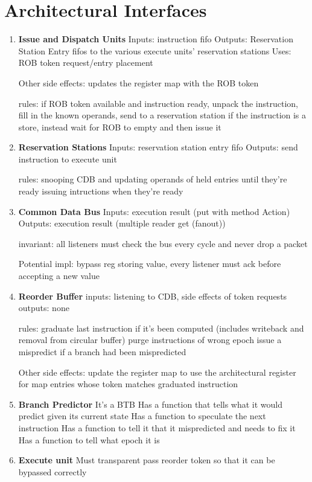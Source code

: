 \documentclass[12pt]{article}
\begin{document}
\section{Architectural Interfaces}

\begin{enumerate}
    \item \textbf{Issue and Dispatch Units}
Inputs: instruction fifo
Outputs: Reservation Station Entry fifos to the various execute units' reservation stations
Uses: ROB token request/entry placement

Other side effects: updates the register map with the ROB token

rules: if ROB token available and instruction ready, unpack the instruction, fill in the known operands, send to a reservation station
if the instruction is a store, instead wait for ROB to empty and then issue it
    \item \textbf{Reservation Stations}
Inputs: reservation station entry fifo
Outputs: send instruction to execute unit

rules: snooping CDB and updating operands of held entries until they're ready
issuing intructions when they're ready
    \item \textbf{Common Data Bus}
Inputs: execution result (put with method Action)
Outputs: execution result (multiple reader get (fanout))

invariant: all listeners must check the bus every cycle and never drop a packet

Potential impl: bypass reg storing value, every listener must ack before accepting a new value
    \item \textbf{Reorder Buffer}
inputs: listening to CDB, side effects of token requests
outputs: none

rules: graduate last instruction if it's been computed (includes writeback and removal from circular buffer)
purge instructions of wrong epoch
issue a mispredict if a branch had been mispredicted

Other side effects: update the register map to use the architectural register for map entries whose token matches graduated instruction
    \item \textbf{Branch Predictor}
It's a BTB
Has a function that tells what it would predict given its current state
Has a function to speculate the next instruction
Has a function to tell it that it mispredicted and needs to fix it
Has a function to tell what epoch it is

    \item \textbf{Execute unit}
Must transparent pass reorder token so that it can be bypassed correctly
\end{enumerate}
    
\end{document}
